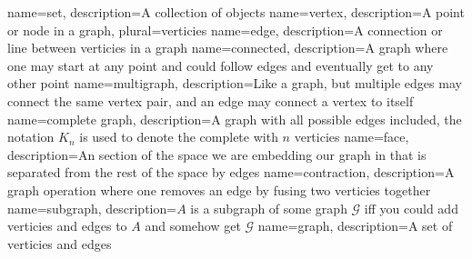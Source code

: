 \usepackage[toc,xindy]{glossaries}

\makenoidxglossaries

{
	name={set},
	description={A collection of objects}
}
{
	name={vertex},
	description={A point or node in a graph},
	plural={verticies}
}
{
	name={edge},
	description={A connection or line between verticies in a graph}
}
{
	name={connected},
	description={A graph where one may start at any point and could follow edges and eventually get to any other point}
}
{
	name={multigraph},
	description={Like a graph, but multiple edges may connect the same vertex pair, and an edge may connect a vertex to itself}
}
{
	name={complete graph},
	description={A graph with all possible edges included, the notation $K_n$ is used to denote the complete with $n$ verticies}
}
{
	name={face},
	description={An section of the space we are embedding our graph in that is separated from the rest of the space by edges}
}
{
	name={contraction},
	description={A graph operation where one removes an edge by fusing two verticies together}
}
{
	name={subgraph},
	description={$A$ is a subgraph of some graph $\mathcal G$ iff you could add verticies and edges to $A$ and somehow get $\mathcal G$}
}
{
	name={graph},
	description={A set of verticies and edges}
}